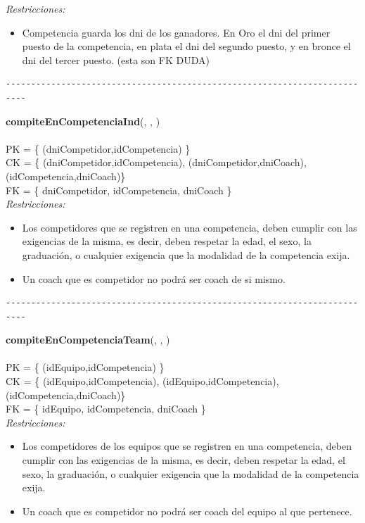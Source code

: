 \textit{Restricciones:}
\begin{itemize}
	\item Competencia guarda los dni de los ganadores. En Oro el dni del primer puesto de la competencia, en plata el dni del segundo puesto, y en bronce el dni del tercer puesto. (esta son FK DUDA)
\end{itemize}

\begin{verbatim}
--------------------------------------------------------------------------
\end{verbatim}

\noindent\textbf{compiteEnCompetenciaInd}(, , )
\\
\\
PK = \{ (dniCompetidor,idCompetencia) \} \\
CK = \{ (dniCompetidor,idCompetencia), (dniCompetidor,dniCoach), (idCompetencia,dniCoach)\} \\
FK = \{ dniCompetidor, idCompetencia, dniCoach \} \\

\textit{Restricciones:}
\begin{itemize}
	\item Los competidores que se registren en una competencia, deben cumplir con las exigencias de la misma, es decir, deben respetar la edad, el sexo, la graduación, o cualquier exigencia que la modalidad de la competencia exija.
	\item Un coach que es competidor no podrá ser coach de si mismo.
\end{itemize}


\begin{verbatim}
--------------------------------------------------------------------------
\end{verbatim}

\noindent\textbf{compiteEnCompetenciaTeam}(, , )
\\
\\
PK = \{ (idEquipo,idCompetencia) \} \\
CK = \{ (idEquipo,idCompetencia), (idEquipo,idCompetencia), (idCompetencia,dniCoach)\} \\
FK = \{ idEquipo, idCompetencia, dniCoach \} \\

\textit{Restricciones:}
\begin{itemize}
	\item Los competidores de los equipos que se registren en una competencia, deben cumplir con las exigencias de la misma, es decir, deben respetar la edad, el sexo, la graduación, o cualquier exigencia que la modalidad de la competencia exija.
	\item Un coach que es competidor no podrá ser coach del equipo al que pertenece.
\end{itemize}

